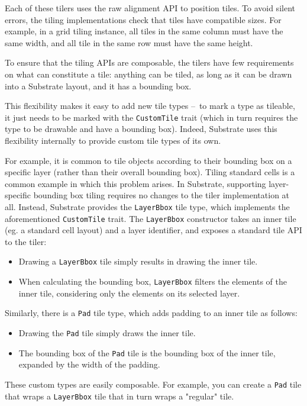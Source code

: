 Each of these tilers uses the raw alignment API to position tiles.
To avoid silent errors, the tiling implementations check that tiles have compatible sizes.
For example, in a grid tiling instance, all tiles in the same column must have the same width,
and all tile in the same row must have the same height.

To ensure that the tiling APIs are composable, the tilers have few requirements
on what can constitute a tile: anything can be tiled, as long as it can be drawn
into a Substrate layout, and it has a bounding box.

This flexibility makes it easy to add new tile types – to mark a type as tileable,
it just needs to be marked with the \verb|CustomTile| trait (which in turn requires
the type to be drawable and have a bounding box). Indeed, Substrate uses
this flexibility internally to provide custom tile types of its own.

For example, it is common to tile objects according to their bounding box
on a specific layer (rather than their overall bounding box).
Tiling standard cells is a common example in which this problem arises.
In Substrate, supporting layer-specific bounding box tiling requires no changes
to the tiler implementation at all.
Instead, Substrate provides the \verb|LayerBbox| tile type, which implements the
aforementioned \verb|CustomTile| trait. The \verb|LayerBbox| constructor takes an inner tile
(eg. a standard cell layout) and a layer identifier, and exposes a standard tile API to the tiler:
\begin{itemize}
\item Drawing a \verb|LayerBbox| tile simply results in drawing the inner tile.
\item When calculating the bounding box, \verb|LayerBbox| filters the elements of the inner tile, considering
  only the elements on its selected layer.
\end{itemize}

Similarly, there is a \verb|Pad| tile type, which adds padding to an inner tile as follows:
\begin{itemize}
\item Drawing the \verb|Pad| tile simply draws the inner tile.
\item The bounding box of the \verb|Pad| tile is the bounding box of the inner tile, expanded by the width of the padding.
\end{itemize}

These custom types are easily composable. For example, you can create a \verb|Pad| tile that wraps a \verb|LayerBbox| tile
that in turn wraps a "regular" tile.


